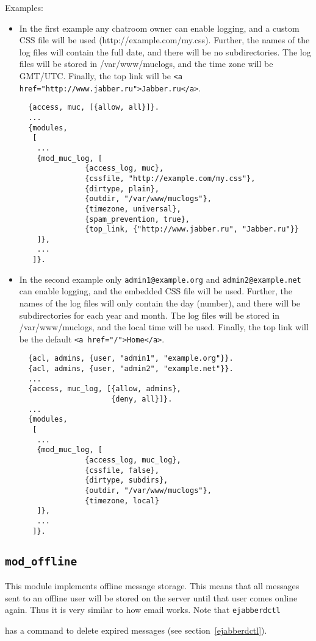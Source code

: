 \documentclass[a4paper,10pt]{book}
\newcommand{\ind}[1]{\begin{latexonly}\index{#1}\end{latexonly}}
\newcommand{\jid}[1]{\texttt{#1}}
\newcommand{\term}[1]{\texttt{#1}}
\newcommand{\module}[1]{\texttt{#1}}
\newcommand{\modoffline}{\module{mod\_offline}}
\begin{document}
Examples:
\begin{itemize}
\item In the first example any chatroom owner can enable logging, and a
  custom CSS file will be used (http://example.com/my.css). Further, the names
  of the log files will contain the full date, and there will be no
  subdirectories. The log files will be stored in /var/www/muclogs, and the
  time zone will be GMT/UTC. Finally, the top link will be
  \verb|<a href="http://www.jabber.ru">Jabber.ru</a>|.
  \begin{verbatim}
  {access, muc, [{allow, all}]}.
  ...
  {modules,
   [
    ...
    {mod_muc_log, [
               {access_log, muc},
               {cssfile, "http://example.com/my.css"},
               {dirtype, plain},
               {outdir, "/var/www/muclogs"},
               {timezone, universal},
               {spam_prevention, true},
               {top_link, {"http://www.jabber.ru", "Jabber.ru"}}
    ]},
    ...
   ]}.
\end{verbatim}
  \item In the second example only \jid{admin1@example.org} and
  \jid{admin2@example.net} can enable logging, and the embedded CSS file will be
  used. Further, the names of the log files will only contain the day (number),
  and there will be subdirectories for each year and month. The log files will
  be stored in /var/www/muclogs, and the local time will be used. Finally, the
  top link will be the default \verb|<a href="/">Home</a>|.
  \begin{verbatim}
  {acl, admins, {user, "admin1", "example.org"}}.
  {acl, admins, {user, "admin2", "example.net"}}.
  ...
  {access, muc_log, [{allow, admins},
                     {deny, all}]}.
  ...
  {modules,
   [
    ...
    {mod_muc_log, [
               {access_log, muc_log},
               {cssfile, false},
               {dirtype, subdirs},
               {outdir, "/var/www/muclogs"},
               {timezone, local}
    ]},
    ...
   ]}.
\end{verbatim}
\end{itemize}

\subsection{\modoffline{}}
\label{modoffline}
\ind{modules!\modoffline{}}

This module implements offline message storage. This means that all messages
sent to an offline user will be stored on the server until that user comes
online again. Thus it is very similar to how email works. Note that
\term{ejabberdctl}\ind{ejabberdctl} has a command to delete expired messages
(see section~\ref{ejabberdctl}).
\end{document}
